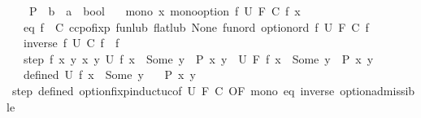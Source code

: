 \begin{isabellebody}
\ \ \ \ P\ {\isacharcolon}{\kern0pt}{\isacharcolon}{\kern0pt}\ {\isachardoublequoteopen}{\isacharprime}{\kern0pt}b\ {\isasymRightarrow}\ {\isacharprime}{\kern0pt}a\ {\isasymRightarrow}\ bool{\isachardoublequoteclose}\isanewline
\ \ \ mono{\isacharcolon}{\kern0pt}\ {\isachardoublequoteopen}{\isasymAnd}x{\isachardot}{\kern0pt}\ mono{\isacharunderscore}{\kern0pt}option\ {\isacharparenleft}{\kern0pt}{\isasymlambda}f{\isachardot}{\kern0pt}\ U\ {\isacharparenleft}{\kern0pt}F\ {\isacharparenleft}{\kern0pt}C\ f{\isacharparenright}{\kern0pt}{\isacharparenright}{\kern0pt}\ x{\isacharparenright}{\kern0pt}{\isachardoublequoteclose}\isanewline
\ \ \ eq{\isacharcolon}{\kern0pt}\ {\isachardoublequoteopen}f\ {\isasymequiv}\ C\ {\isacharparenleft}{\kern0pt}ccpo{\isachardot}{\kern0pt}fixp\ {\isacharparenleft}{\kern0pt}fun{\isacharunderscore}{\kern0pt}lub\ {\isacharparenleft}{\kern0pt}flat{\isacharunderscore}{\kern0pt}lub\ None{\isacharparenright}{\kern0pt}{\isacharparenright}{\kern0pt}\ {\isacharparenleft}{\kern0pt}fun{\isacharunderscore}{\kern0pt}ord\ option{\isacharunderscore}{\kern0pt}ord{\isacharparenright}{\kern0pt}\ {\isacharparenleft}{\kern0pt}{\isasymlambda}f{\isachardot}{\kern0pt}\ U\ {\isacharparenleft}{\kern0pt}F\ {\isacharparenleft}{\kern0pt}C\ f{\isacharparenright}{\kern0pt}{\isacharparenright}{\kern0pt}{\isacharparenright}{\kern0pt}{\isacharparenright}{\kern0pt}{\isachardoublequoteclose}\isanewline
\ \ \ inverse{}{\isacharcolon}{\kern0pt}\ {\isachardoublequoteopen}{\isasymAnd}f{\isachardot}{\kern0pt}\ U\ {\isacharparenleft}{\kern0pt}C\ f{\isacharparenright}{\kern0pt}\ {\isacharequal}{\kern0pt}\ f{\isachardoublequoteclose}\isanewline
\ \ \ step{\isacharcolon}{\kern0pt}\ {\isachardoublequoteopen}{\isasymAnd}f\ x\ y{\isachardot}{\kern0pt}\ {\isacharparenleft}{\kern0pt}{\isasymAnd}x\ y{\isachardot}{\kern0pt}\ U\ f\ x\ {\isacharequal}{\kern0pt}\ Some\ y\ {\isasymLongrightarrow}\ P\ x\ y{\isacharparenright}{\kern0pt}\ {\isasymLongrightarrow}\ U\ {\isacharparenleft}{\kern0pt}F\ f{\isacharparenright}{\kern0pt}\ x\ {\isacharequal}{\kern0pt}\ Some\ y\ {\isasymLongrightarrow}\ P\ x\ y{\isachardoublequoteclose}\isanewline
\ \ \ defined{\isacharcolon}{\kern0pt}\ {\isachardoublequoteopen}U\ f\ x\ {\isacharequal}{\kern0pt}\ Some\ y{\isachardoublequoteclose}\isanewline
\ \ \ {\isachardoublequoteopen}P\ x\ y{\isachardoublequoteclose}\isanewline
%
\isadelimproof
\ \ %
\endisadelimproof
%
\isatagproof
{}\isamarkupfalse%
\ step\ defined\ option{\isachardot}{\kern0pt}fixp{\isacharunderscore}{\kern0pt}induct{\isacharunderscore}{\kern0pt}uc{\isacharbrackleft}{\kern0pt}of\ U\ F\ C{\isacharcomma}{\kern0pt}\ OF\ mono\ eq\ inverse{}\ option{\isacharunderscore}{\kern0pt}admissible{\isacharbrackright}{\kern0pt}\isanewline

\end{isabellebody}
